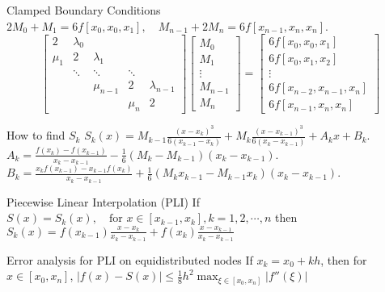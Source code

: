 \documentclass[10pt,landscape]{article}
\theoremstyle{definition}
\newcommand{\thistheoremname}{}
\newtheorem*{genericthm*}{\thistheoremname}
\newenvironment{namedthm*}[1]
{\renewcommand{\thistheoremname}{#1}\begin{genericthm*}}
{\end{genericthm*}}
\begin{document}
\begin{multicols}{3}
	\begin{namedthm*}{Clamped Boundary Conditions}\(2 M_{0}+M_{1}=6 f\left[x_{0}, x_{0}, x_{1}\right], \quad M_{n-1}+2 M_{n}=6 f\left[x_{n-1}, x_{n}, x_{n}\right]\).
		\[
			\begin{bmatrix}
				2     & \lambda_0 &           &        &               \\
				\mu_1 & 2         & \lambda_1 &        &               \\
				      & \ddots    & \ddots    & \ddots &               \\
				      &           & \mu_{n-1} & 2      & \lambda_{n-1} \\
				      &           &           & \mu_n  & 2
			\end{bmatrix}
			\begin{bmatrix}
				M_0     \\
				M_1     \\
				\vdots  \\
				M_{n-1} \\
				M_{n}
			\end{bmatrix} =
			\begin{bmatrix}
				6f[x_0,x_0,x_1]           \\
				6f[x_0,x_1,x_2]           \\
				\vdots                    \\
				6f[x_{n-2},x_{n-1},x_{n}] \\
				6f[x_{n-1},x_{n}, x_n]
			\end{bmatrix}
		\]
	\end{namedthm*}

	\begin{namedthm*}{How to find \(S_k\)} \(S_{k}(x)=M_{k-1} \frac{\left(x-x_{k}\right)^{3}}{6\left(x_{k-1}-x_{k}\right)}+M_{k} \frac{\left(x-x_{k-1}\right)^{3}}{6\left(x_{k}-x_{k-1}\right)}+A_{k} x+B_{k}\). \(A_{k}=\frac{f\left(x_{k}\right)-f\left(x_{k-1}\right)}{x_{k}-x_{k-1}}-\frac{1}{6}\left(M_{k}-M_{k-1}\right)\left(x_{k}-x_{k-1}\right)\).\\ \(B_{k}=\frac{x_{k} f\left(x_{k-1}\right)-x_{k-1} f\left(x_{k}\right)}{x_{k}-x_{k-1}}+\frac{1}{6}\left(M_{k} x_{k-1}-M_{k-1} x_{k}\right)\left(x_{k}-x_{k-1}\right)\).
	\end{namedthm*}
	\begin{namedthm*}{Piecewise Linear Interpolation (PLI)} If \(S(x) = S_k(x), \quad \text {for } x\in [x_{k-1}, x_k], k = 1,2,\cdots, n\) then
		\(S_k(x)=f(x_{k-1}) \frac{x-x_k}{x_k-x_{k-1}}+f(x_k) \frac{x-x_{k-1}}{x_k-x_{k-1}}\)
	\end{namedthm*}
	\begin{namedthm*}{Error analysis for PLI on equidistributed nodes}
		If \(x_{k}=x_{0}+k h\), then for \(x \in [x_0,x_n]\), \(|f(x)-S(x)| \leq \frac{1}{8}h^2\max_{\xi \in [x_0,x_n]}|f''(\xi)|\)
	\end{namedthm*}



\end{multicols}
\end{document}
